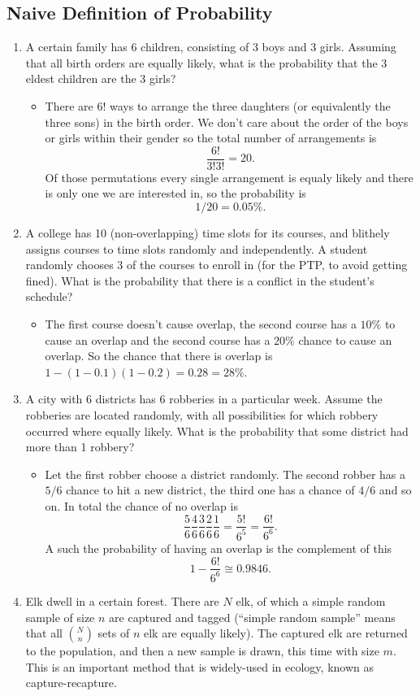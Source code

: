 \documentclass{article}
\begin{document}
\subsection{Naive Definition of Probability}
\begin{enumerate}
	\item A certain family has 6 children, consisting of 3 boys and 3 girls. Assuming that all birth orders are equally likely, what is the probability that the 3 eldest children are the 3 girls?
		\begin{itemize}
			\item There are $6!$ ways to arrange the three daughters (or equivalently the three sons) in the birth order. We don't care about the order of the boys or girls within their gender so the total number of arrangements is
			$$
			\frac{6!}{3! 3!} = 20.
			$$
			Of those permutations every single arrangement is equaly likely and there is only one we are interested in, so the probability is
			$$
			1/20 = 0.05\%.
			$$
		\end{itemize}
	\item  A college has 10 (non-overlapping) time slots for its courses, and blithely assigns courses to time slots randomly and independently. A student randomly chooses 3 of the courses to enroll in (for the PTP, to avoid getting fined). What is the probability that there is a conflict in the student’s schedule?
		\begin{itemize}
			\item The first course doesn't cause overlap, the second course has a $10\%$ to cause an overlap and the second course has a $20\%$ chance to cause an overlap. So the chance that there is overlap is $1 - (1 - 0.1)(1 - 0.2) = 0.28 = 28\%$.
		\end{itemize}
	\item A city with 6 districts has 6 robberies in a particular week. Assume the robberies are located randomly, with all possibilities for which robbery occurred where equally likely. What is the probability that some district had more than 1 robbery?
		\begin{itemize}
			\item Let the first robber choose a district randomly. The second robber has a $5/6$ chance to hit a new district, the third one has a chance of $4/6$ and so on. In total the chance of no overlap is
			$$
			\frac{5}{6} \frac{4}{6} \frac{3}{6} \frac{2}{6} \frac{1}{6} = \frac{5!}{6^5} = \frac{6!}{6^6}.
			$$
			A such the probability of having an overlap is the complement of this
			$$
			1 - \frac{6!}{6^6} \cong 0.9846.
			$$
		\end{itemize}
	\item Elk dwell in a certain forest. There are $N$ elk, of which a simple random sample of size $n$ are captured and tagged (“simple random sample” means that all $\binom{N}{n}$ sets of $n$ elk are equally likely). The captured elk are returned to the population, and then a new sample is drawn, this time with size $m$. This is an important method that is widely-used in ecology, known as capture-recapture.


\end{enumerate}
\end{document}
